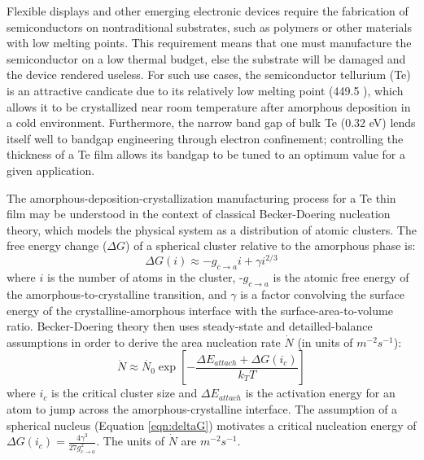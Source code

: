 Flexible displays and other emerging electronic devices require the fabrication
of semiconductors on nontraditional substrates, such as polymers or other
materials with low melting points.  This requirement means that one must
manufacture the semiconductor on a low thermal budget, else the substrate will
be damaged and the device rendered useless.  For such use cases, the
semiconductor tellurium (Te) is an attractive candicate due to its relatively
low melting point (449.5 ), which allows it to be crystallized
near room temperature after amorphous deposition in a cold environment.
Furthermore, the narrow band gap of bulk Te (0.32 eV) lends itself well to
bandgap engineering through electron confinement; controlling the thickness of
a Te film allows its bandgap to be tuned to an optimum value for a given
application.\cite{chrzan:2020}

The amorphous-deposition-crystallization manufacturing process for a Te thin film may be understood in the context of classical Becker-Doering nucleation theory, which models the physical system as a distribution of atomic clusters.\cite{chrzan:2020}  The free energy change ($\Delta G$) of a spherical cluster relative to the amorphous phase is:
%
	\begin{equation}
		\Delta G(i) \approx -g_{c \rightarrow a}i + \gamma i^{2/3}
	\label{eqn:deltaG}
	\end{equation}
%
where $i$ is the number of atoms in the cluster, -$g_{c \rightarrow a}$ is the atomic free energy of the amorphous-to-crystalline transition, and $\gamma$ is a factor convolving the surface energy of the crystalline-amorphous interface with the surface-area-to-volume ratio.  Becker-Doering theory then uses steady-state and detailled-balance assumptions in order to derive the area nucleation rate $\dot{N}$ (in units of $m^{-2}s^{-1}$):
%
	\begin{equation}
		\dot{N} \approx \dot{N_0} 
		\exp\left[-\frac{\Delta E_{attach} + \Delta G(i_c)}{k_T T}\right]
	\label{eqn:N_dot}
	\end{equation}
%
where $i_c$ is the critical cluster size and $\Delta E_{attach}$ is the activation energy for an atom to jump across the amorphous-crystalline interface.  The assumption of a spherical nucleus (Equation \ref{eqn:deltaG}) motivates a critical nucleation energy of $\Delta G(i_c) = \frac{4 \gamma^3}{27g_{c \rightarrow a}^2}$.  The units of $\dot{N}$ are $m^{-2}s^{-1}$.

